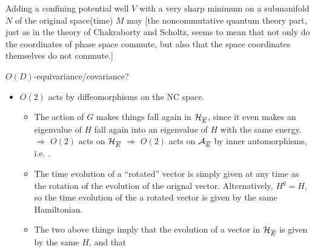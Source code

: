 {\begin{itemize}
        \end{itemize}
        
        
        
    \cite{FioreTheCase2020} Adding a confining potential well $V$ with a very sharp minimum on a submanifold $N$ of the original space(time) $M$ may  [the noncommutative quantum theory part, just as in the theory of Chakraborty and Scholtz, seems to mean that not only do the coordinates of phase space commute, but also that the space coordinates themselves do not commute.]
    
    
    
    
    \lin   
    
    $O(D)$-equivariance/covariance?
    
        \begin{itemize}
            
        \item {} $O(2)$ acts by diffeomorphisms on the NC space.
            
            \begin{itemize}
                
            \item The action of $G$ makes things fall again in $\mathcal H_{\overline{E}}$, since it even makes an eigenvalue of $H$ fall again into an eigenvalue of $H$ with the same energy.
$\Rightarrow$ $O(2)$ acts on $\mathcal H_{\overline{E}}$ $\Rightarrow$ $O(2)$ acts on $\mathcal A_{\overline{E}}$ by inner automorphisms, i.e. .    
            \item The time evolution of a ``rotated'' vector is simply given at any time as the rotation of the evolution of the orignal vector. Alternatively, $H^g = H$, so the time evolution of the a rotated vector is given by the same Hamiltonian.
            
            \item The two above things imply that the evolution of a vector in $\mathcal H_{\overline{E}}$ is given by the same $H$, and that 
            
                
            \end{itemize}
            

\end{itemize}}
